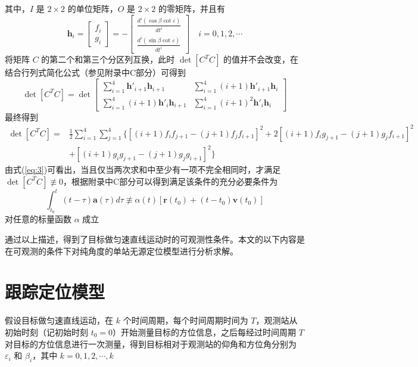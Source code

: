 其中，$I$ 是 $2 \times 2$ 的单位矩阵，$O$ 是 $2 \times 2$ 的零矩阵，并且有
\begin{equation}
	\bm{h}_i = \left[\begin{array}{c}
		f_i \\ g_i
	\end{array}\right] = - \left[\begin{array}{c}
	\frac{d^i(\cos\beta\cot\varepsilon)}{dt^i} \\
	\frac{d^i(\sin\beta\cot\varepsilon)}{dt^i}
\end{array}\right] \quad i=0,1,2,\cdots
\end{equation}
将矩阵 $C$ 的第二个和第三个分区列互换，此时 $\det[C^TC]$ 的值并不会改变，在结合行列式简化公式（参见附录中C部分）可得到
\begin{equation}
	\det[C^TC] = \det \left[\begin{array}{cc}
		\sum_{i=1}^{4}\bm{h}'_{i+1}\bm{h}_{i+1} & \sum_{i=1}^{4}(i+1)\bm{h}'_{i+1}\bm{h}_i \\
		\sum_{i=1}^{4} (i+1)\bm{h}'_{i}\bm{h}_{i+1} & \sum_{i=1}^{4}(i+1)^2\bm{h}'_i\bm{h}_i
	\end{array}\right]
\end{equation}
最终得到
\begin{equation}
	\begin{split}
		\det[C^TC] =& \frac{1}{2}\sum_{i=1}^{4}\sum_{j=1}^{4}\lbrace [(i+1)f_i f_{j+1} - (j+1)f_j f_{i+1}]^2 + 2[(i+1)f_i g_{j+1} - (j+1) g_j f_{i+1}]^2 \\
		&+ [(i+1)g_i g_{j+1} - (j+1)g_j g_{i+1}]^2 \rbrace
	\end{split}	\label{eq:3}
\end{equation}
由式(\ref{eq:3})可看出，当且仅当两次求和中至少有一项不完全相同时，才满足 $\det[C^TC] \not \equiv 0$，根据附录中C部分可以得到满足该条件的充分必要条件为
\begin{equation}
	\int_{t_0}^{t}(t-\tau)\bm{a}(\tau)d\tau \not \equiv \alpha(t)[\bm{r}(t_0)+(t-t_0)\bm{v}(t_0)]
\end{equation}
对任意的标量函数 $\alpha$ 成立

通过以上描述，得到了目标做匀速直线运动时的可观测性条件。本文的以下内容是在可观测的条件下对纯角度的单站无源定位模型进行分析求解。
\section{跟踪定位模型}
假设目标做匀速直线运动，在 $k$ 个时间周期，每个时间周期时间为 $T$，观测站从初始时刻（记初始时刻 $t_0=0$）开始测量目标的方位信息，之后每经过时间周期 $T$ 对目标的方位信息进行一次测量，得到目标相对于观测站的仰角和方位角分别为 $\varepsilon_i$ 和 $\beta_i$，其中 $k = 0,1,2,\cdots,k$ 

